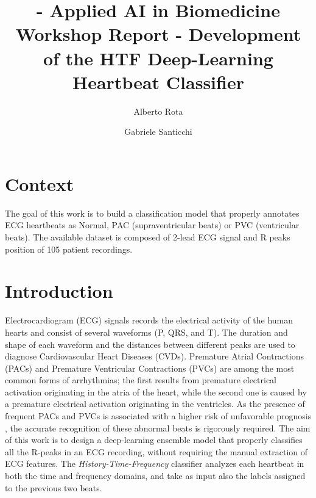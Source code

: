 \documentclass[conference]{IEEEtran}
\begin{document}
\title{ - Applied AI in Biomedicine Workshop Report - Development of the HTF Deep-Learning Heartbeat Classifier   }

\author{
    Alberto Rota
    \\
\and
    Gabriele Santicchi 
    }
\maketitle

\section{Context}
    The goal of this work is to build a classification model that
    properly annotates ECG heartbeats as Normal, PAC (supraventricular
    beats) or PVC (ventricular beats). The available dataset is
    composed of 2-lead ECG signal and R peaks position of 105 patient 
    recordings. 

\section{Introduction}
    Electrocardiogram (ECG) signals records the electrical activity of
    the human hearts and consist of several waveforms (P, QRS, and T).
    The duration and shape of each waveform and the distances between
    different peaks are used to diagnose Cardiovascular Heart Diseases
    (CVDs). Premature Atrial Contractions (PACs) and Premature
    Ventricular Contractions (PVCs) are among the most common forms of
    arrhythmias; the first results from premature electrical
    activation originating in the atria of the heart, while the second
    one is caused by a premature electrical activation originating in
    the ventricles. As the presence of frequent PACs and PVCs is
    associated with a higher risk of unfavorable prognosis \cite{relation_of}
    \cite{cardiac_mortality}, the accurate recognition of these abnormal beats 
    is rigorously required.
    The aim of this work is to design a deep-learning ensemble
    model that properly classifies all the R-peaks in an ECG recording,
    without requiring the manual extraction of ECG features. The
    \textit{History-Time-Frequency} classifier analyzes each heartbeat in both
    the time and frequency domains, and take as input also the labels
    assigned to the previous two beats. 
\end{document}
